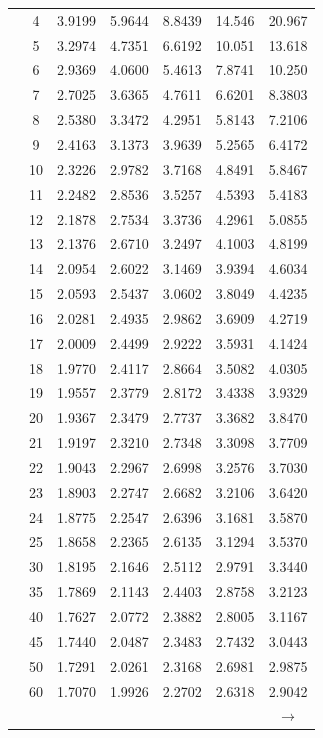 \begin{minipage}{0.49\textwidth}
\begin{center}
\begin{tabular}{ccccccc}
			& 4 & 3.9199 & 5.9644 & 8.8439 & 14.546 & 20.967 \\
			& 5 & 3.2974 & 4.7351 & 6.6192 & 10.051 & 13.618 \\
			& 6 & 2.9369 & 4.0600 & 5.4613 & 7.8741 & 10.250 \\
			& 7 & 2.7025 & 3.6365 & 4.7611 & 6.6201 & 8.3803 \\
			& 8 & 2.5380 & 3.3472 & 4.2951 & 5.8143 & 7.2106 \\
			& 9 & 2.4163 & 3.1373 & 3.9639 & 5.2565 & 6.4172 \\[5pt]
			& 10 & 2.3226 & 2.9782 & 3.7168 & 4.8491 & 5.8467 \\
			& 11 & 2.2482 & 2.8536 & 3.5257 & 4.5393 & 5.4183 \\
			& 12 & 2.1878 & 2.7534 & 3.3736 & 4.2961 & 5.0855 \\
			& 13 & 2.1376 & 2.6710 & 3.2497 & 4.1003 & 4.8199 \\
			& 14 & 2.0954 & 2.6022 & 3.1469 & 3.9394 & 4.6034 \\
			& 15 & 2.0593 & 2.5437 & 3.0602 & 3.8049 & 4.4235 \\
			& 16 & 2.0281 & 2.4935 & 2.9862 & 3.6909 & 4.2719 \\
			& 17 & 2.0009 & 2.4499 & 2.9222 & 3.5931 & 4.1424 \\
			& 18 & 1.9770 & 2.4117 & 2.8664 & 3.5082 & 4.0305 \\
			& 19 & 1.9557 & 2.3779 & 2.8172 & 3.4338 & 3.9329 \\[5pt]
			& 20 & 1.9367 & 2.3479 & 2.7737 & 3.3682 & 3.8470 \\
			& 21 & 1.9197 & 2.3210 & 2.7348 & 3.3098 & 3.7709 \\
			& 22 & 1.9043 & 2.2967 & 2.6998 & 3.2576 & 3.7030 \\
			& 23 & 1.8903 & 2.2747 & 2.6682 & 3.2106 & 3.6420 \\
			& 24 & 1.8775 & 2.2547 & 2.6396 & 3.1681 & 3.5870 \\
			& 25 & 1.8658 & 2.2365 & 2.6135 & 3.1294 & 3.5370 \\
			& 30 & 1.8195 & 2.1646 & 2.5112 & 2.9791 & 3.3440 \\
			& 35 & 1.7869 & 2.1143 & 2.4403 & 2.8758 & 3.2123 \\
			& 40 & 1.7627 & 2.0772 & 2.3882 & 2.8005 & 3.1167 \\
			& 45 & 1.7440 & 2.0487 & 2.3483 & 2.7432 & 3.0443 \\[5pt]
			& 50 & 1.7291 & 2.0261 & 2.3168 & 2.6981 & 2.9875 \\
			& 60 & 1.7070 & 1.9926 & 2.2702 & 2.6318 & 2.9042 \\
			&  &  &  &  &  & $\rightarrow$ \\
		\end{tabular}
	\end{center}
\end{minipage}

